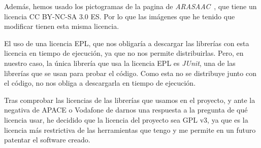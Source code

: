 Además, hemos usado los pictogramas de la pagina de \textit{ARASAAC}~\cite{arasaac}, que tiene un licencia CC BY-NC-SA 3.0 ES. Por lo que las imágenes que he tenido que modificar tienen esta misma licencia.

El uso de una licencia EPL, que nos obligaría a descargar las librerías con esta licencia en tiempo de ejecución, ya que no nos permite distribuirlas. Pero, en nuestro caso, la única librería que usa la licencia EPL es \textit{JUnit}, una de las librerías que se usan para probar el código. Como esta no se distribuye junto con el código, no nos obliga a descargarla en tiempo de ejecución.

Tras comprobar las licencias de las librerías que usamos en el proyecto, y ante la negativa de APACE o Vodafone de darnos una respuesta a la pregunta de qué licencia usar, he decidido que la licencia del proyecto sea GPL v3, ya que es la licencia más restrictiva de las herramientas que tengo y me permite en un futuro patentar el software creado.